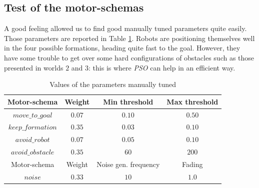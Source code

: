 \documentclass[journal]{IEEEtran}
\begin{document}
\subsection{Test of the motor-schemas}
A good feeling allowed us to find good manually tuned parameters quite 
easily. Those parameters are reported in Table \ref{manual_param}. Robots 
are positioning themselves well in the four possible formations, heading 
quite fast to the goal. However, they have some trouble to get over some 
hard configurations of obstacles such as those presented in worlds $2$ and 
$3$: this is where \textit{PSO} can help in an efficient way. 
\begin{table}
\begin{center}
\begin{tabular}{|c|c|c|c|}
  \hline
  Motor-schema & Weight & Min threshold & Max threshold\\
  \hline
  $move\_to\_goal$ &  $0.07$ & $0.10$ & $0.50$\\
  $keep\_formation$ & $0.35$ & $0.03$ & $0.10$\\
  $avoid\_robot$ & $0.07$ & $0.05$ & $0.10$\\
  $avoid\_obstacle$ & $0.35$ & $60$ & $200$\\
  \hline
  Motor-schema & Weight & Noise gen. frequency & Fading \\
  \hline
  $noise$ & $0.33$ & $10$ & $1.0$\\
  \hline
\end{tabular}
\caption{Values of the parameters manually tuned} \label{manual_param}
\end{center} 
\end{table}
\end{document}
